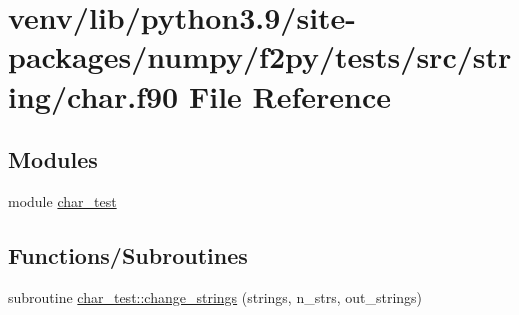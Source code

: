 \hypertarget{char_8f90}{}\section{venv/lib/python3.9/site-\/packages/numpy/f2py/tests/src/string/char.f90 File Reference}
\label{char_8f90}
\subsection*{Modules}
\begin{DoxyCompactItemize}
\item 
module \hyperlink{namespacechar__test}{char\+\_\+test}
\end{DoxyCompactItemize}
\subsection*{Functions/\+Subroutines}
\begin{DoxyCompactItemize}
\item 
subroutine \hyperlink{namespacechar__test_a74f23ccc17a091911ae0fd9495830dba}{char\+\_\+test\+::change\+\_\+strings} (strings, n\+\_\+strs, out\+\_\+strings)
\end{DoxyCompactItemize}

